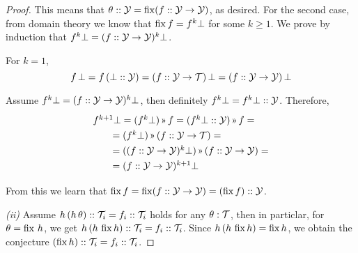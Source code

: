\begin{proof}
This means that $\theta::\mathcal{Y} = \operatorname{fix}(f::\mathcal{Y}\to\mathcal{Y})$, as desired.
For the second case, from domain theory we know that $\operatorname{fix} f = f^k\bot$ for some $k\geq 1$.
We prove by induction that $f^k\bot = (f :: \mathcal{Y}\to\mathcal{Y})^k\bot$.

For $k=1$, \[f\,\bot = f\,(\bot :: \mathcal{Y}) = (f :: \mathcal{Y}\to\mathcal{T})\,\bot = (f :: \mathcal{Y}\to\mathcal{Y})\,\bot\]

Assume $f^k\bot = (f :: \mathcal{Y}\to\mathcal{Y})^k\bot$, then definitely $f^k\bot = f^k\bot :: \mathcal{Y}$.
Therefore, 
\[\renewcommand\arraystretch{1.3}
  \begin{array}{l}
    f^{k+1}\bot = (f^k\bot)\applt f = (f^k\bot::\Y)\applt f = \\
    \qquad = (f^k\bot)\applt(f::\Y\to\T) = \\
    \qquad = ((f :: \Y\to\Y)^k\bot) \applt (f::\Y\to\Y) = \\
    \qquad = (f::\Y\to\Y)^{k+1}\bot
  \end{array}
\]

From this we learn that $\operatorname{fix} f = \operatorname{fix}(f :: \mathcal{Y}\to\mathcal{Y}) = (\operatorname{fix} f) :: \mathcal{Y}$.


{\it (ii)} Assume $h\,(h\,\theta) :: \mathcal{T}_i = f_i :: \mathcal{T}_i$ holds for any $\theta:\mathcal{T}$,
then in particlar, for $\theta=\operatorname{fix}\,h$, we get $h\,(h\,\operatorname{fix} h) :: \mathcal{T}_i = f_i :: \mathcal{T}_i$.
Since $h\,(h\,\operatorname{fix} h) = \operatorname{fix} h$, we obtain the conjecture $(\operatorname{fix} h) :: \mathcal{T}_i = f_i :: \mathcal{T}_i$.

\begin{comment}
\[\forall \overline\theta.\quad h\,(f\,\overline\theta)=f\,\overline\theta \quad\]
%
and let $\theta=\theta_{1..r}$ such that $\theta_i=\fix f_i$. So $f_i\,\theta_i=\theta_i$.
Let $\theta=\theta_1::\T_1/\cdots/\theta_r::\T_r$.
\[\renewcommand\arraystretch{1.3}
  \begin{array}{l@{}l}
   f\,\overline\theta & {}= (f_1\,\theta_1)::\T_1 / \cdots / (f_r\,\theta_r)::\T_r =  \\
     & {}= \theta_1::\T_1 / \cdots / \theta_r::\T_r = \theta \\[.5em]
   h\,\theta & {}= h\,(f\,\overline\theta) = f\,\overline\theta = \theta
   \end{array}\qquad\]
   
Then $\theta=\fix h$;\\
We get $\fix h = (\fix f_1)::\T_1 / \cdots / (\fix f_r)::\T_r$,
as required.

({\it ii}) assume
\[\renewcommand\arraystretch{1.3}
  \forall\theta. \quad
  \begin{array}{l}
  \displaystyle
    h\,\theta = \theta ~\limplies \bigwedge_{i=1..r}(f_i\,\theta)::\T_i = \theta::\T_i \\
    \theta = \theta::\T_1 ~\big/~ \cdots ~\big/~ \theta::\T_r
  \end{array}  
\]
%
and let $\theta=\fix h$. So $h\,\theta=\theta$, therefore $(f_i\,\theta)::\T_i=\theta::\T_i$.
Since we assume that $\fix f_i$, we get by induction that $(\fix f_i)::\T_i=\theta::\T_i$.
Hence,
\[(\fix f_1)::\T_1 / \cdots / (\fix f_r)::\T_r = \theta::\T_1 / \cdots / \theta::\T_r = \theta\]
\end{comment}
\end{proof}

